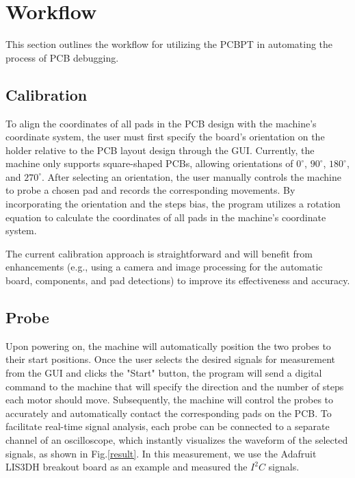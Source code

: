 \documentclass[sigconf]{acmart}
\begin{document}
\section{Workflow}
This section outlines the workflow for utilizing the PCBPT in automating the process of PCB debugging.

\subsection{Calibration}
To align the coordinates of all pads in the PCB design with the machine's coordinate system, the user must first specify the board's orientation on the holder relative to the PCB layout design through the GUI. Currently, the machine only supports square-shaped PCBs, allowing orientations of $0^{\circ}$, $90^{\circ}$, $180^{\circ}$, and $270^{\circ}$. After selecting an orientation, the user manually controls the machine to probe a chosen pad and records the corresponding movements. By incorporating the orientation and the steps bias, the program utilizes a rotation equation \cite{rotation_equation} to calculate the coordinates of all pads in the machine's coordinate system.

The current calibration approach is straightforward and will benefit from enhancements (e.g., using a camera and image processing for the automatic board, components, and pad detections\cite{inspect_ar}) to improve its effectiveness and accuracy.

\subsection{Probe}
Upon powering on, the machine will automatically position the two probes to their start positions. Once the user selects the desired signals for measurement from the GUI and clicks the "Start" button, the program will send a digital command to the machine that will specify the direction and the number of steps each motor should move. Subsequently, the machine will control the probes to accurately and automatically contact the corresponding pads on the PCB. To facilitate real-time signal analysis, each probe can be connected to a separate channel of an oscilloscope, which instantly visualizes the waveform of the selected signals, as shown in Fig.\ref{result}. In this measurement, we use the Adafruit LIS3DH breakout board as an example and measured the $I^2C$ signals.
\end{document}
